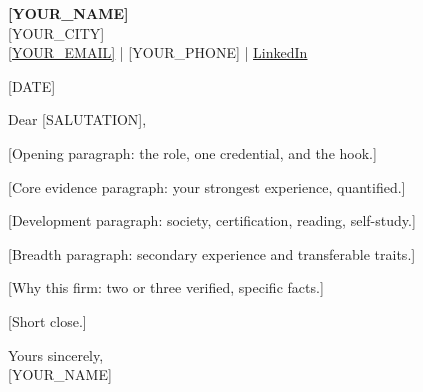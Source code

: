 \documentclass[11pt,a4paper]{article}
\newcommand{\link}[2]{\href{#1}{\textcolor{linkblue}{\underline{#2}}}}
\begin{document}
\begin{center}
{\bfseries [YOUR_NAME]}\\[1pt]
{\small [YOUR_CITY]}\\[1pt]
{\small \link{mailto:[YOUR_EMAIL]}{[YOUR_EMAIL]} | [YOUR_PHONE] | \link{[YOUR_LINKEDIN_URL]}{LinkedIn}}
\end{center}

\vspace{2pt}
[DATE]

Dear [SALUTATION],

[Opening paragraph: the role, one credential, and the hook.]

[Core evidence paragraph: your strongest experience, quantified.]

[Development paragraph: society, certification, reading, self-study.]

[Breadth paragraph: secondary experience and transferable traits.]

[Why this firm: two or three verified, specific facts.]

[Short close.]

Yours sincerely,\\[2pt]
[YOUR_NAME]
\end{document}
